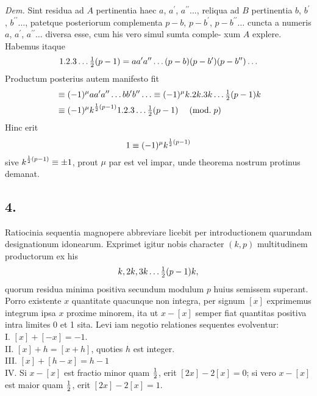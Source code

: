 \documentclass[twoside,12pt, showframe]{memoir}
\renewcommand{\pmod}[1]{\;(\textrm{mod.}\;#1)}
\let\oldfrac\frac
\def\frac#1#2{\mathchoice{\tfrac{#1}{#2}}{\oldfrac{#1}{#2}}{\genfrac{}{}{}{2}{#1}{#2\mathstrut}}{\genfrac{}{}{}{3}{#1}{#2\mathstrut}}}
\begin{document}
\textit{Dem.} Sint residua ad \(A\) pertinentia haec \(a\), \(a^{\prime}\), \(a^{\prime \prime} \ldots\), reliqua ad \(B\) pertinentia \(b\), \(b^{\prime}\), \(b^{\prime \prime} \ldots\), patetque posteriorum complementa \(p-b\), \(p-b^{\prime}\), \(p-b^{\prime \prime} \ldots\) cuncta a numeris \(a\), \(a^{\prime}\), \(a^{\prime \prime} \ldots\) diversa esse, cum his vero simul sumta comple-\clearpage\noindent%
xum \({A}\) explere. Habemus itaque
\[1 . 2 . 3 \ldots \frac{1}{2}(p-1)=a a^{\prime} a^{\prime \prime} \ldots(p-b)(p-b^{\prime})(p-b^{\prime \prime}) \ldots\]
Productum posterius autem manifesto fit
\[\begin{aligned}
& \equiv(-1)^{\mu} a a^{\prime} a^{\prime \prime} \ldots b b^{\prime} b^{\prime \prime} \ldots \equiv(-1)^{\mu} k . 2 k .3 k \ldots \frac{1}{2}(p-1) k \\
& \equiv(-1)^{\mu} k^{\frac{1}{2}(p-1)} 1.2 .3 \ldots \frac{1}{2}(p-1) \quad\pmod{p}
\end{aligned}\]
Hinc erit
\[1 \equiv(-1)^{\mu} k^{\frac{1}{2}(p-1)}\]
sive \(k^{\frac{1}{2}(p-1)} \equiv \pm 1\), prout \(\mu\) par est vel impar, unde theorema nostrum protinus demanat.

\subsection*{4.}
 
Ratiocinia sequentia magnopere abbreviare licebit per introductionem quarundam designationum idonearum. Exprimet igitur nobis character \((k, p)\) multitudinem productorum ex his
\[k, 2 k, 3 k \ldots \frac{1}{2}(p-1) k,\]
quorum residua minima positiva secundum modulum \(p\) huius semissem superant. Porro existente \(x\) quantitate quacunque non integra, per signum \([x]\) exprimemus integrum ipsa \(x\) proxime minorem, ita ut \(x-[x]\) semper fiat quantitas positiva intra limites \(0\) et 1 sita. Levi iam negotio relationes sequentes evolventur:\\
 
I. \([x]+[-x]=-1\).\\
 
II. \([x]+h =[x+h]\), quoties \(h\) est integer.\\
 
III. \([x]+[h-x]=h-1\)\\
 
IV. Si \(x-[x]\) est fractio minor quam \(\frac{1}{2}\), erit \([2 x]-2[x]=0\); si vero \(x-[x]\) est maior quam \(\frac{1}{2}\), erit \([2 x]-2[x]=1\).\\
 
\end{document}

